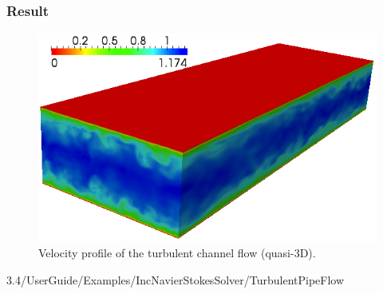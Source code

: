 \subsubsection{Result}
\begin{figure}
\begin{center}
\includegraphics[width=12cm]{Figures/ChanCont.png}
\caption{Velocity profile of the turbulent channel flow (quasi-3D).}
\end{center}
\end{figure}

\newpage

3.4/UserGuide/Examples/IncNavierStokesSolver/TurbulentPipeFlow

